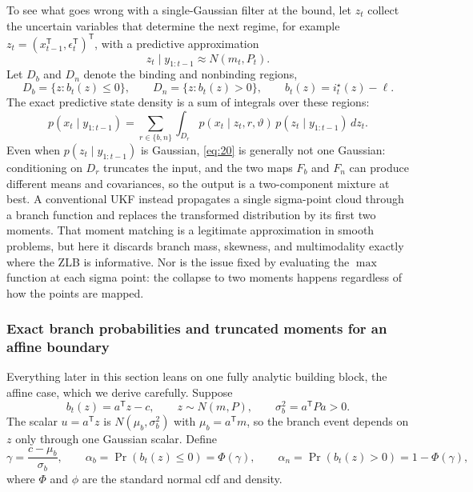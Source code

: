 \documentclass[11pt]{article}
\begin{document}
To see what goes wrong with a single-Gaussian filter at the bound, let $z_t$
collect the uncertain variables that determine the next regime, for
example $z_t=(x_{t-1}^{\mathsf T},\epsilon_t^{\mathsf T})^{\mathsf T}$,
with a predictive approximation
\begin{equation}\label{eq:18}
 z_t\mid y_{1:t-1}\approx N(m_t,P_t).
\end{equation}
Let $D_b$ and $D_n$ denote the binding and nonbinding regions,
\begin{equation}\label{eq:19}
 D_b=\{z:b_t(z)\leq0\},
 \qquad
 D_n=\{z:b_t(z)>0\},
 \qquad
 b_t(z)=i_t^\star(z)-\ell .
\end{equation}
The exact predictive state density is a sum of integrals over these regions:
\begin{equation}\label{eq:20}
 p(x_t\mid y_{1:t-1})
 =\sum_{r\in\{b,n\}}
 \int_{D_r}p(x_t\mid z_t,r,\vartheta)\,
       p(z_t\mid y_{1:t-1})\,dz_t .
\end{equation}
Even when $p(z_t\mid y_{1:t-1})$ is Gaussian, \eqref{eq:20} is generally not
one Gaussian: conditioning on $D_r$ truncates the input, and the two maps
$F_b$ and $F_n$ can produce different means and covariances, so the output is
a two-component mixture at best. A conventional UKF instead propagates a
single sigma-point cloud through a branch function and replaces the
transformed distribution by its first two moments. That moment matching is a
legitimate approximation in smooth problems, but here it discards branch
mass, skewness, and multimodality exactly where the ZLB is informative. Nor
is the issue fixed by evaluating the $\max$ function at each sigma point:
the collapse to two moments happens regardless of how the points are mapped.

\subsubsection{Exact branch probabilities and truncated moments for an
affine boundary}
\label{sec:ukf-truncmoments}

Everything later in this section leans on one fully analytic building
block, the affine case, which we derive carefully.
Suppose
\begin{equation}\label{eq:21}
 b_t(z)=a^{\mathsf T}z-c,
 \qquad z\sim N(m,P),
 \qquad \sigma_b^2=a^{\mathsf T}Pa>0 .
\end{equation}
The scalar $u=a^{\mathsf T}z$ is $N(\mu_b,\sigma_b^2)$ with
$\mu_b=a^{\mathsf T}m$, so the branch event depends on $z$ only through one
Gaussian scalar. Define
\begin{equation}\label{eq:22}
 \gamma=\frac{c-\mu_b}{\sigma_b},
 \qquad
 \alpha_b=\Pr(b_t(z)\leq0)=\Phi(\gamma),
 \qquad
 \alpha_n=\Pr(b_t(z)>0)=1-\Phi(\gamma),
\end{equation}
where $\Phi$ and $\phi$ are the standard normal cdf and density.
\end{document}
